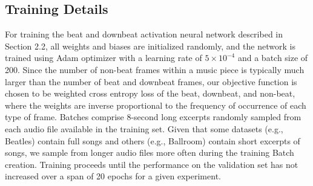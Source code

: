 \documentclass{article}
\begin{document}
\subsection{Training Details}
For training the beat and downbeat activation neural network described in Section 2.2, all weights and biases are initialized randomly, and the network is trained using Adam optimizer with a learning rate of $5 \times 10^{-4}$ and a batch size of 200.
Since the number of non-beat frames within a music piece is typically much larger than the number of beat and downbeat frames, our objective function is chosen to be weighted cross entropy loss of the beat, downbeat, and non-beat, where the weights are inverse proportional to the frequency of occurrence of each type of frame.
Batches comprise 8-second long excerpts randomly sampled from each audio file available in the training set. Given that some datasets (e.g., Beatles) contain full songs and others (e.g., Ballroom) contain short excerpts of songs, we sample from longer audio files more often during the training Batch creation.
Training proceeds until the performance on the validation set has not increased over a span of 20 epochs for a given experiment.
\end{document}
